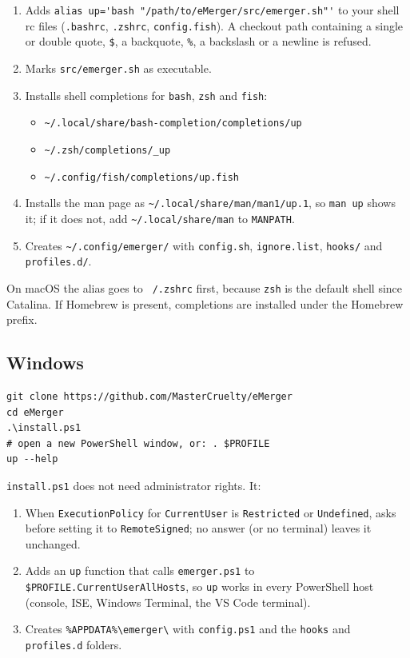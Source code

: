 \documentclass[11pt,a4paper]{article}
\begin{document}
\begin{enumerate}
  \item Adds \verb|alias up='bash "/path/to/eMerger/src/emerger.sh"'| to
        your shell rc files (\texttt{.bashrc}, \texttt{.zshrc},
        \texttt{config.fish}). A checkout path containing a single or
        double quote, \verb|$|, a backquote, \verb|%|, a backslash or a
        newline is refused.
  \item Marks \texttt{src/emerger.sh} as executable.
  \item Installs shell completions for \texttt{bash}, \texttt{zsh} and
        \texttt{fish}:
        \begin{itemize}
          \item \verb|~/.local/share/bash-completion/completions/up|
          \item \verb|~/.zsh/completions/_up|
          \item \verb|~/.config/fish/completions/up.fish|
        \end{itemize}
  \item Installs the man page as \verb|~/.local/share/man/man1/up.1|, so
        \texttt{man up} shows it; if it does not, add
        \verb|~/.local/share/man| to \texttt{MANPATH}.
  \item Creates \verb|~/.config/emerger/| with \texttt{config.sh},
        \texttt{ignore.list}, \texttt{hooks/} and \texttt{profiles.d/}.
\end{enumerate}

On macOS the alias goes to \texttt{\string~/.zshrc} first, because
\texttt{zsh} is the default shell since Catalina. If Homebrew is present,
completions are installed under the Homebrew prefix.

\subsection{Windows}

\begin{lstlisting}[language=psplus]
git clone https://github.com/MasterCruelty/eMerger
cd eMerger
.\install.ps1
# open a new PowerShell window, or: . $PROFILE
up --help
\end{lstlisting}

\texttt{install.ps1} does not need administrator rights. It:

\begin{enumerate}
  \item When \texttt{ExecutionPolicy} for \texttt{CurrentUser} is
        \texttt{Restricted} or \texttt{Undefined}, asks before setting it
        to \texttt{RemoteSigned}; no answer (or no terminal) leaves it
        unchanged.
  \item Adds an \texttt{up} function that calls \texttt{emerger.ps1} to
        \verb|$PROFILE.CurrentUserAllHosts|, so \texttt{up} works in
        every PowerShell host (console, ISE, Windows Terminal, the
        VS Code terminal).
  \item Creates \verb|%APPDATA%\emerger\| with \texttt{config.ps1} and
        the \texttt{hooks} and \texttt{profiles.d} folders.
\end{enumerate}
\end{document}
